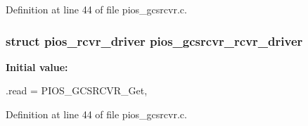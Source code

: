 \-Definition at line 44 of file pios\-\_\-gcsrcvr.\-c.

\hypertarget{group___p_i_o_s___g_c_s_r_c_v_r_ga6405e16bd59aa95205a0d825e3f0b31d}{
\subsubsection[{pios\-\_\-gcsrcvr\-\_\-rcvr\-\_\-driver}]{\setlength{\rightskip}{0pt plus 5cm}struct {\bf pios\-\_\-rcvr\-\_\-driver} {\bf pios\-\_\-gcsrcvr\-\_\-rcvr\-\_\-driver}}}\label{group___p_i_o_s___g_c_s_r_c_v_r_ga6405e16bd59aa95205a0d825e3f0b31d}
{\bfseries \-Initial value\-:}
\begin{DoxyCode}
 {
        .read = PIOS_GCSRCVR_Get,
}
\end{DoxyCode}


\-Definition at line 44 of file pios\-\_\-gcsrcvr.\-c.

